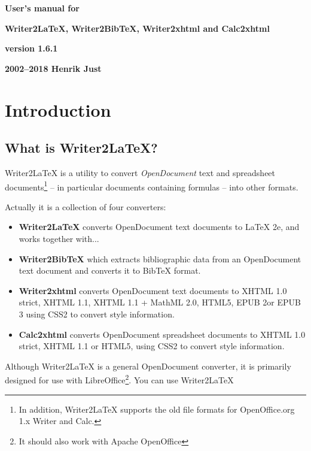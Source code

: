 \documentclass{article}
\title{}
\author{}
\date{2018-08-24}
\newcommand\liststyleLi{%
\renewcommand\labelitemi{${\bullet}$}
\renewcommand\labelitemii{${\circ}$}
\renewcommand\labelitemiii{${\blacksquare}$}
\renewcommand\labelitemiv{${\bullet}$}
}
\begin{document}
{\centering\sffamily\bfseries
User's manual for
\par}

{%
 \par}
{\centering\sffamily\bfseries
Writer2LaTeX, Writer2BibTeX, Writer2xhtml and Calc2xhtml
\par}

{\centering\sffamily\bfseries
version 1.6.1
\par}

{\centering\sffamily\bfseries
{\textcopyright} 2002--2018 Henrik Just
\par}

\setcounter{tocdepth}{2}
\renewcommand\contentsname{Table of Contents}
\tableofcontents
\section{Introduction}
\subsection{What is Writer2LaTeX?}
{\mdseries
Writer2LaTeX is a utility to convert \emph{OpenDocument} text and spreadsheet documents\footnote{In addition, Writer2LaTeX supports the old file formats for OpenOffice.org 1.x Writer and Calc.} -- in particular documents containing formulas -- into other formats.}

{\mdseries
Actually it is a collection of four converters:}

\liststyleLi
\begin{itemize}
\item \textbf{Writer2LaTeX} converts OpenDocument text documents to LaTeX 2e, and works together with...
\item \textbf{Writer2BibTeX} which extracts bibliographic data from an OpenDocument text document and converts it to BibTeX format.
\item \textbf{Writer2xhtml} converts OpenDocument text documents to XHTML 1.0 strict, XHTML 1.1, XHTML 1.1 + MathML 2.0, HTML5, EPUB 2or EPUB 3 using CSS2 to convert style information.
\item \textbf{Calc2xhtml} converts OpenDocument spreadsheet documents to XHTML 1.0 strict, XHTML 1.1 or HTML5, using CSS2 to convert style information.
\end{itemize}
{\mdseries
Although Writer2LaTeX is a general OpenDocument converter, it is primarily designed for use with LibreOffice\footnote{It should also work with Apache OpenOffice}. You can use Writer2LaTeX}
\end{document}
